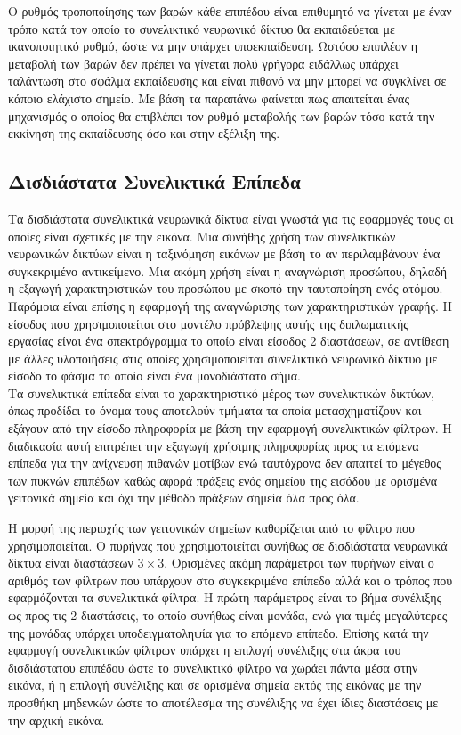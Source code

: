Ο ρυθμός τροποποίησης των βαρών κάθε επιπέδου είναι επιθυμητό να γίνεται με έναν τρόπο κατά τον οποίο το συνελικτικό νευρωνικό δίκτυο θα εκπαιδεύεται με ικανοποιητικό ρυθμό, ώστε να μην υπάρχει υποεκπαίδευση. Ωστόσο επιπλέον η μεταβολή των βαρών δεν πρέπει να γίνεται πολύ γρήγορα ειδάλλως υπάρχει ταλάντωση στο σφάλμα εκπαίδευσης και είναι πιθανό να μην μπορεί να συγκλίνει σε κάποιο ελάχιστο σημείο. Με βάση τα παραπάνω φαίνεται πως απαιτείται ένας μηχανισμός ο οποίος θα επιβλέπει τον ρυθμό μεταβολής των βαρών τόσο κατά την εκκίνηση της εκπαίδευσης όσο και στην εξέλιξη της.

\subsection{Δισδιάστατα Συνελικτικά Επίπεδα}
Τα δισδιάστατα συνελικτικά νευρωνικά δίκτυα είναι γνωστά για τις εφαρμογές τους οι οποίες είναι σχετικές με την εικόνα. Μια συνήθης χρήση των συνελικτικών νευρωνικών δικτύων είναι η ταξινόμηση εικόνων με βάση το αν περιλαμβάνουν ένα συγκεκριμένο αντικείμενο. Μια ακόμη χρήση είναι η αναγνώριση προσώπου, δηλαδή η εξαγωγή χαρακτηριστικών του προσώπου με σκοπό την ταυτοποίηση ενός ατόμου. Παρόμοια είναι επίσης η εφαρμογή της αναγνώρισης των χαρακτηριστικών γραφής. 
Η είσοδος που χρησιμοποιείται στο μοντέλο πρόβλεψης αυτής της διπλωματικής εργασίας είναι ένα σπεκτρόγραμμα το οποίο είναι είσοδος 2 διαστάσεων, σε αντίθεση με άλλες υλοποιήσεις στις οποίες χρησιμοποιείται συνελικτικό νευρωνικό δίκτυο με είσοδο το φάσμα το οποίο είναι ένα μονοδιάστατο σήμα.\\

Τα συνελικτικά επίπεδα είναι το χαρακτηριστικό μέρος των συνελικτικών δικτύων, όπως προδίδει το όνομα τους αποτελούν τμήματα τα οποία μετασχηματίζουν και εξάγουν από την είσοδο πληροφορία με βάση την εφαρμογή συνελικτικών φίλτρων. Η διαδικασία αυτή επιτρέπει την εξαγωγή χρήσιμης πληροφορίας προς τα επόμενα επίπεδα για την ανίχνευση πιθανών μοτίβων ενώ ταυτόχρονα δεν απαιτεί το μέγεθος των πυκνών  επιπέδων καθώς αφορά πράξεις ενός σημείου της εισόδου με ορισμένα γειτονικά σημεία και όχι την μέθοδο πράξεων σημεία όλα προς όλα.

Η μορφή της περιοχής των γειτονικών σημείων καθορίζεται από το φίλτρο  που χρησιμοποιείται. Ο πυρήνας που χρησιμοποιείται συνήθως σε δισδιάστατα νευρωνικά δίκτυα είναι διαστάσεων $3\times3$. Ορισμένες ακόμη παράμετροι των πυρήνων είναι ο αριθμός των φίλτρων που υπάρχουν στο συγκεκριμένο επίπεδο αλλά και ο τρόπος που εφαρμόζονται τα συνελικτικά φίλτρα. Η πρώτη παράμετρος είναι το βήμα συνέλιξης ως προς τις 2 διαστάσεις, το οποίο συνήθως είναι μονάδα, ενώ για τιμές μεγαλύτερες της μονάδας υπάρχει υποδειγματοληψία για το επόμενο επίπεδο. Επίσης κατά την εφαρμογή συνελικτικών φίλτρων υπάρχει η επιλογή συνέλιξης στα άκρα του δισδιάστατου επιπέδου ώστε το συνελικτικό φίλτρο να χωράει πάντα μέσα στην εικόνα, ή η επιλογή συνέλιξης και σε ορισμένα σημεία εκτός της εικόνας με την προσθήκη μηδενκών ώστε το αποτέλεσμα της συνέλιξης να έχει ίδιες διαστάσεις με την αρχική εικόνα.

